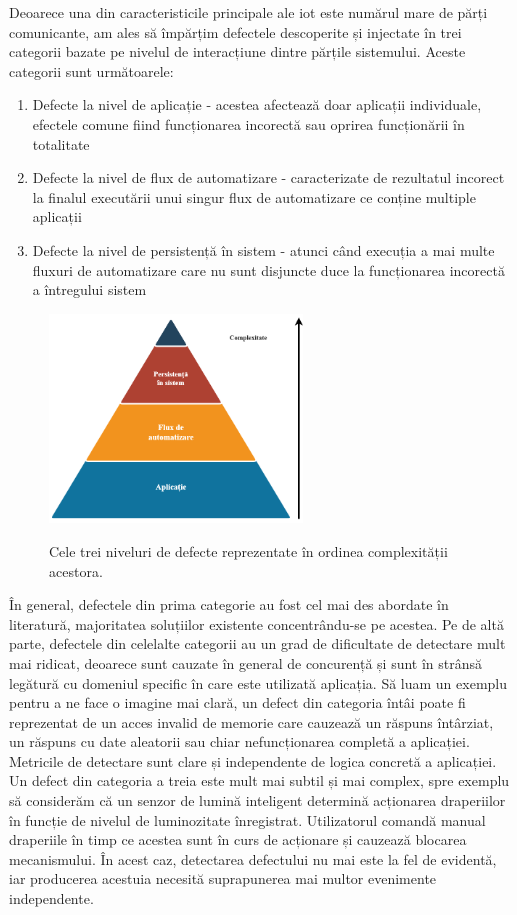 Deoarece una din caracteristicile principale ale \acrshort{iot} este numărul mare de părți comunicante, am ales să împărțim defectele descoperite și injectate în trei categorii bazate pe nivelul de interacțiune dintre părțile sistemului. Aceste categorii sunt următoarele:

\begin{enumerate}
    \item Defecte la nivel de aplicație - acestea afectează doar aplicații individuale, efectele comune fiind funcționarea incorectă sau oprirea funcționării în totalitate
    \item Defecte la nivel de flux de automatizare - caracterizate de rezultatul incorect la finalul executării unui singur flux de automatizare ce conține multiple aplicații
    \item Defecte la nivel de persistență în sistem - atunci când execuția a mai multe fluxuri de automatizare care nu sunt disjuncte duce la funcționarea incorectă a întregului sistem
\end{enumerate}

\begin{figure}[h]
    \centering
    \caption{\centering Cele trei niveluri de defecte reprezentate în ordinea complexității acestora.}
    \includegraphics[width=0.6\textwidth]{images/niveluri_defecte.drawio (1).png}
    \label{fig:bug_levels}
\end{figure}

În general, defectele din prima categorie au fost cel mai des abordate în literatură, majoritatea soluțiilor existente concentrându-se pe acestea. Pe de altă parte, defectele din celelalte categorii au un grad de dificultate de detectare mult mai ridicat, deoarece sunt cauzate în general de concurență și sunt în strânsă legătură cu domeniul specific în care este utilizată aplicația. Să luam un exemplu pentru a ne face o imagine mai clară, un defect din categoria întâi poate fi reprezentat de un acces invalid de memorie care cauzează un răspuns întârziat, un răspuns cu date aleatorii sau chiar nefuncționarea completă a aplicației. Metricile de detectare sunt clare și independente de logica concretă a aplicației. Un defect din categoria a treia este mult mai subtil și mai complex, spre exemplu să considerăm că un senzor de lumină inteligent determină acționarea draperiilor în funcție de nivelul de luminozitate înregistrat. Utilizatorul comandă manual draperiile în timp ce acestea sunt în curs de acționare și cauzează blocarea mecanismului. În acest caz, detectarea defectului nu mai este la fel de evidentă, iar producerea acestuia necesită suprapunerea mai multor evenimente independente. 

